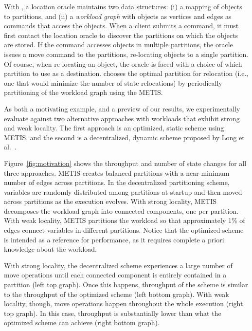 With \dynastar, a location oracle maintains two data structures: (i) a
mapping of objects to partitions, and (ii) a \emph{workload graph}
with objects as vertices and edges as commands that access the
objects.  When a client submits a command, it must first contact the
location oracle to discover the partitions on which the objects are
stored.  If the command accesses objects in multiple partitions, the
oracle issues a move command to the partitions, re-locating objects to
a single partition. Of course, when re-locating an object, the oracle
is faced with a choice of which partition to use as a destination.
\dynastar chooses the optimal partition for relocation (i.e., one that
would minimize the number of state relocations) by periodically
partitioning of the workload graph using the METIS.


As both a motivating example, and a preview of our results, we
experimentally evaluate \dynastar against two alternative approaches
with workloads that exhibit strong and weak locality. The first
approach is an optimized, static scheme using METIS, and the second is
a decentralized, dynamic scheme proposed by Long et
al.~\cite{hoang2016}.  

Figure~\ref{fig:motivation} shows the throughput and number of state
changes for all three approaches. METIS creates balanced partitions with a near-minimum
number of edges across partitions.  In the decentralized partitioning
scheme, variables are randomly distributed among partitions at startup
and then moved across partitions as the execution evolves.  With
strong locality, METIS decomposes the workload graph into connected
components, one per partition.  With weak locality, METIS partitions
the workload so that approximately 1\% of edges connect variables in
different partitions.  Notice that the optimized scheme is intended as
a reference for performance, as it requires complete a priori
knowledge about the workload.

 With strong locality,
the decentralized scheme experiences a large number of move operations
until each connected component is entirely contained in a partition
(left top graph).  Once this happens, throughput of the scheme is
similar to the throughput of the optimized scheme (left bottom graph).
With weak locality, though, move operations happen throughout the
whole execution (right top graph).  In this case, throughput is
substantially lower than what the optimized scheme can achieve (right
bottom graph).



